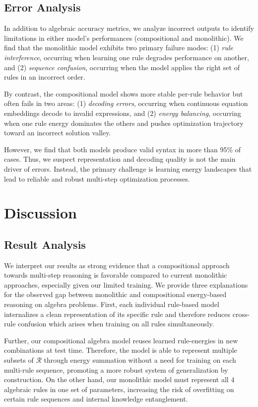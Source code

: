 \documentclass{article}
\begin{document}
\subsection{Error Analysis}

In addition to algebraic accuracy metrics, we analyze incorrect outputs to identify limitations in either model's performances (compositional and monolithic). We find that the monolithic model exhibits two primary failure modes: (1) \textit{rule interference}, occurring when learning one rule degrades performance on another, and (2) \textit{sequence confusion}, occurring when the model applies the right set of rules in an incorrect order.

By contrast, the compositional model shows more stable per-rule behavior but often fails in two areas: (1) \textit{decoding errors}, occurring when continuous equation embeddings decode to invalid expressions, and (2) \textit{energy balancing}, occurring when one rule energy dominates the others and pushes optimization trajectory toward an incorrect solution valley.

However, we find that both models produce valid syntax in more than 95\% of cases. Thus, we suspect representation and decoding quality is not the main driver of errors. Instead, the primary challenge is learning energy landscapes that lead to reliable and robust multi-step optimization processes.

\section{Discussion}

\subsection{Result Analysis}

We interpret our results as strong evidence that a compositional approach towards multi-step reasoning is favorable compared to current monolithic approaches, especially given our limited training. We provide three explanations for the observed gap between monolithic and compositional energy-based reasoning on algebra problems. First, each individual rule-based model internalizes a clean representation of its specific rule and therefore reduces cross-rule confusion which arises when training on all rules simultaneously. 

Further, our compositional algebra model reuses learned rule-energies in new combinations at test time. Therefore, the model is able to represent multiple subsets of $\mathcal{R}$ through energy summation without a need for training on each multi-rule sequence, promoting a more robust system of generalization by construction. On the other hand, our monolithic model must represent all 4 algebraic rules in one set of parameters, increasing the risk of overfitting on certain rule sequences and internal knowledge entanglement.
\end{document}
